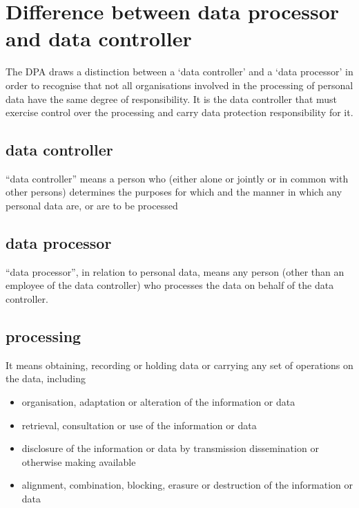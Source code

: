 \documentclass[a4paper,12pt]{article}
\begin{document}
\clearpage
 \section{Difference between data processor and data controller}
The DPA draws a distinction between a ‘data controller’ and a
‘data processor’ in order to recognise that not all organisations
involved in the processing of personal data have the same
degree of responsibility. It is the data controller that must
exercise control over the processing and carry data protection
responsibility for it. 

\subsection{data controller}
“data controller” means a person who (either alone or
jointly or in common with other persons) determines the
purposes for which and the manner in which any personal data
are, or are to be processed

\subsection{data processor}
“data processor”, in relation to personal data, means any
person (other than an employee of the data controller) who
processes the data on behalf of the data controller.

\subsection{processing}
It means
obtaining, recording or holding data or
carrying any set of operations on the
data, including
\begin{itemize}
    \item organisation, adaptation or alteration of the information or data
    \item retrieval, consultation or use of the information or data
    \item  disclosure of the information or data by transmission dissemination or otherwise making available
    \item  alignment, combination, blocking, erasure or destruction of the information or data
\end{itemize}

\clearpage

\printindex
\end{document}

